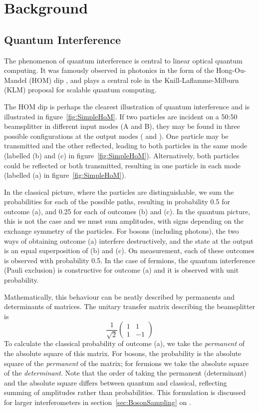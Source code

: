\chapter{Background}
\label{ch:Background}
\section{Quantum Interference}
\label{sec:HOM}
The phenomenon of quantum interference is central to linear optical quantum
computing. It was famously observed in photonics in the form of the
Hong-Ou-Mandel (HOM) dip \cite{hom}, and plays a central role in the
Knill-Laflamme-Milburn (KLM) proposal for scalable quantum computing.

The HOM
dip is perhaps the clearest illustration of quantum interference and is
illustrated in figure~\ref{fig:SimpleHoM}. If two particles are incident on a
50:50 beamsplitter in different input modes (A and B), they may be found in
three possible configurations at the output modes (\aprime{} and \bprime{}). One
particle may be transmitted and the other reflected, leading to both particles
in the same mode (labelled (b) and (c) in figure~\ref{fig:SimpleHoM}).
Alternatively, both particles could be reflected or both transmitted, resulting
in one particle in each mode (labelled (a) in figure~\ref{fig:SimpleHoM}).

In the classical picture, where the particles are distinguishable, we sum the
probabilities for each of the possible paths, resulting in probability 0.5 for
outcome (a), and 0.25 for each of outcomes (b) and (c). In the quantum picture,
this is not the case and we must sum amplitudes, with signs depending on the
exchange symmetry of the particles. For bosons (including photons), the two ways
of obtaining outcome (a) interfere destructively, and the state at the output is
an equal superposition of (b) and (c). On measurement, each of these outcomes is
observed with probability 0.5. In the case of fermions, the quantum interference
(Pauli exclusion) is constructive for outcome (a) and it is observed with unit
probability.

Mathematically, this behaviour can be neatly described by permanents and
determinants of matrices. The unitary transfer matrix describing the
beamsplitter is
\[ \frac{1}{\sqrt{2}} \begin{pmatrix} 1 & 1 \\ 1 & -1 \end{pmatrix} \]
To calculate the classical probability of outcome (a), we take the
\emph{permanent} of the absolute square of this matrix. For bosons, the
probability is the absolute square of the \emph{permanent} of the matrix; for
fermions we take the absolute square of the \emph{determinant}. Note that the
order of taking the permanent (determinant) and the absolute square differs
between quantum and classical, reflecting summing of amplitudes rather than
probabilities. This formulation is discussed for larger interferometers in
section~\ref{sec:BosonSampling} on \bosonsampling{}.


